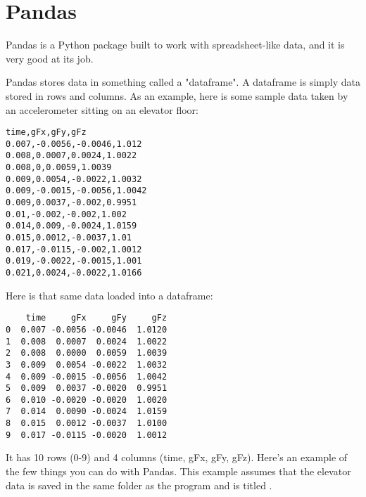 \section{Pandas}
Pandas is a Python package built to work with spreadsheet-like data, and it is very good at its job.

Pandas stores data in something called a "dataframe".  A dataframe is simply data stored in rows and columns. As an example, here is some sample data taken by an accelerometer sitting on an elevator floor:
\begin{Verbatim}
time,gFx,gFy,gFz
0.007,-0.0056,-0.0046,1.012
0.008,0.0007,0.0024,1.0022
0.008,0,0.0059,1.0039
0.009,0.0054,-0.0022,1.0032
0.009,-0.0015,-0.0056,1.0042
0.009,0.0037,-0.002,0.9951
0.01,-0.002,-0.002,1.002
0.014,0.009,-0.0024,1.0159
0.015,0.0012,-0.0037,1.01
0.017,-0.0115,-0.002,1.0012
0.019,-0.0022,-0.0015,1.001
0.021,0.0024,-0.0022,1.0166
\end{Verbatim}

Here is that same data loaded into a dataframe:
\begin{Verbatim}
    time     gFx     gFy     gFz
0  0.007 -0.0056 -0.0046  1.0120
1  0.008  0.0007  0.0024  1.0022
2  0.008  0.0000  0.0059  1.0039
3  0.009  0.0054 -0.0022  1.0032
4  0.009 -0.0015 -0.0056  1.0042
5  0.009  0.0037 -0.0020  0.9951
6  0.010 -0.0020 -0.0020  1.0020
7  0.014  0.0090 -0.0024  1.0159
8  0.015  0.0012 -0.0037  1.0100
9  0.017 -0.0115 -0.0020  1.0012

\end{Verbatim}

It has 10 rows (0-9) and 4 columns (time, gFx, gFy, gFz).  Here's an example of the few things you can do with Pandas.  This example assumes that the elevator data is saved in the same folder as the program and is titled .

